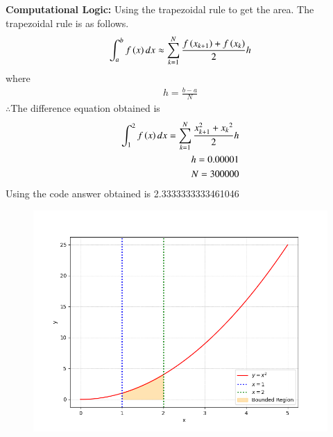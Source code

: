 \documentclass[journal]{IEEEtran}
\begin{document}
\begin{enumerate}
\textbf{Computational Logic:} 
Using the trapezoidal rule to get the area. The trapezoidal rule is as follows.
\begin{align}
    \int^{b}_{a} f\left(x\right)dx\approx \sum^{N}_{k=1}\frac{f\left(x_{k+1}\right)+f\left(x_{k}\right)}{2}h
\end{align}
where
\begin{align}
    h=\frac{b-a}{N}
\end{align}
$\therefore$The difference equation obtained is\\
\begin{align}
    \int^{2}_{1} f\left(x\right)dx=\sum^{N}_{k=1}\frac{{x_{k+1}^2}+{x_{k}}^2}{2}h\\
    h=0.00001\\
    N=300000
\end{align}
Using the code answer obtained is 2.3333333333461046

\begin{figure}[h]
    \centering
    \includegraphics[width=\columnwidth]{figs/fig.png}
 \end{figure}

\end{enumerate}
\end{document}
